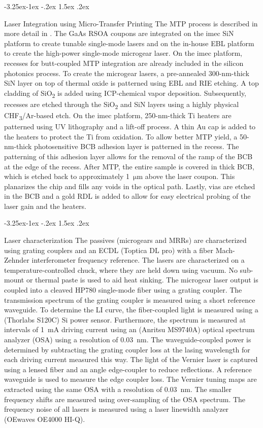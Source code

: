 \documentclass[%
 reprint,
 amsmath,amssymb,
 aps,
]{revtex4-2}
\makeatletter
\renewcommand\subsection{\@startsection {subsection}{2}{0pt}%
  {-3.25ex\@plus -1ex \@minus -.2ex}%
  {1.5ex \@plus .2ex}%
  {\normalfont\normalsize\bfseries\raggedright}}
\makeatother
\begin{document}
\subsection{Laser Integration using Micro-Transfer Printing}
The MTP process is described in more detail in \cite{kiewiet2026micro}. The GaAs RSOA coupons are integrated on the imec SiN platform to create tunable single-mode lasers and on the in-house EBL platform to create the high-power single-mode microgear laser. On the imec platform, recesses for butt-coupled MTP integration are already included in the silicon photonics process. To create the microgear lasers, a pre-annealed 300-nm-thick SiN layer on top of thermal oxide is patterned using EBL and RIE etching. A top cladding of SiO\textsubscript{2} is added using ICP-chemical vapor deposition. Subsequently, recesses are etched through the SiO\textsubscript{2} and SiN layers using a highly physical CHF\textsubscript{3}/Ar-based etch. On the imec platform, 250-nm-thick Ti heaters are patterned using UV lithography and a lift-off process. A thin Au cap is added to the heaters to protect the Ti from oxidation. To allow better MTP yield, a 50-nm-thick photosensitive BCB adhesion layer is patterned in the recess. The patterning of this adhesion layer allows for the removal of the ramp of the BCB at the edge of the recess. After MTP, the entire sample is covered in thick BCB, which is etched back to approximately 1~$\mathrm{\mu m}$ above the laser coupon. This planarizes the chip and fills any voids in the optical path. Lastly, vias are etched in the BCB and a gold RDL is added to allow for easy electrical probing of the laser gain and the heaters.

\subsection{Laser characterization}
The passives (microgears and MRRs) are characterized using grating couplers and an ECDL (Toptica DL pro) with a fiber Mach-Zehnder interferometer frequency reference. The lasers are characterized on a temperature-controlled chuck, where they are held down using vacuum. No sub-mount or thermal paste is used to aid heat sinking. The microgear laser output is coupled into a cleaved HP780 single-mode fiber using a grating coupler. The transmission spectrum of the grating coupler is measured using a short reference waveguide. To determine the LI curve, the fiber-coupled light is measured using a (Thorlabs S120C) Si power sensor. Furthermore, the spectrum is measured at intervals of 1~mA driving current using an (Anritsu MS9740A) optical spectrum analyzer (OSA) using a resolution of 0.03~nm. The waveguide-coupled power is determined by subtracting the grating coupler loss at the lasing wavelength for each driving current measured this way. The light of the Vernier laser is captured using a lensed fiber and an angle edge-coupler to reduce reflections. A reference waveguide is used to measure the edge coupler loss. The Vernier tuning maps are extracted using the same OSA with a resolution of 0.03~nm. The smaller frequency shifts are measured using over-sampling of the OSA spectrum. The frequency noise of all lasers is measured using a laser linewidth analyzer (OEwaves OE4000 HI-Q).
\end{document}
